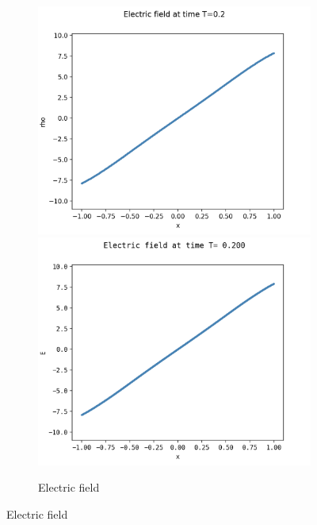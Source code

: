 \documentclass{article}
\numberwithin{equation}{section}
\newcommand{\imh}{\textheight} %
\newcommand{\imw}{\textwidth} %
\begin{document}
\begin{figure}
	\centering
	\newcommand{\rootSL}{../code_SL/}
	\newcommand{\rootFD}{../temp_res_DF/}
	\newcommand{\dirSL}{run_comp_short_time_2sp_Nx1000_Nvi2001_Nve2001_Nt6250}
	\newcommand{\dirFD}{run_comp_short_time_2sp_Nx1000_Nv2000_Nt6250}
	
	\renewcommand{\imh}{0.24\textheight}
	\renewcommand{\imw}{0.45\linewidth}
	
	\begin{subfigure}{\textwidth}
		\centering
		\includegraphics[height=\imh,width=\imw]{images/ET0p2_FD.png}
		\includegraphics[height=\imh,width=\imw]{images/ET0p2.png}
		\caption{Electric field }
		\label{subfig:compT02_E}
	\end{subfigure}


\end{figure}
\end{document}
